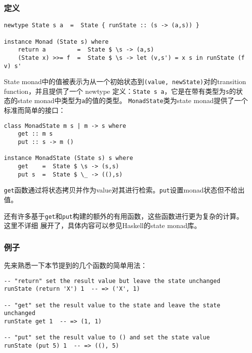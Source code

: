 \subsubsection{定义}
\vspace{-1.5em}
\begin{verbatim}
newtype State s a  =  State { runState :: (s -> (a,s)) }

instance Monad (State s) where
    return a         =  State $ \s -> (a,s)
    (State x) >>= f  =  State $ \s -> let (v,s') = x s in runState (f v) s'
\end{verbatim}
\noindent{}State monad中的值被表示为从一个初始状态到\texttt{(value, newState)}对的transition function，并且提供了一个
newtype 定义：\texttt{State s a}，它是在带有类型为\texttt{s}的状态的state monad中类型为\texttt{a}的值的类型。
\texttt{MonadState}类为state monad提供了一个标准而简单的接口：
\vspace{-0.5em}
\begin{verbatim}
class MonadState m s | m -> s where
    get :: m s
    put :: s -> m ()

instance MonadState (State s) s where
    get    =  State $ \s -> (s,s)
    put s  =  State $ \_ -> ((),s)
\end{verbatim}
\noindent{}\texttt{get}函数通过将状态拷贝并作为value对其进行检索。\texttt{put}设置monad状态但不给出值。

\indent{}还有许多基于\texttt{get}和\texttt{put}构建的额外的有用函数，这些函数进行更为复杂的计算。这里不详细
展开了，具体内容可以参见Haskell的state monad库。

\subsubsection{例子}
\indent{}先来熟悉一下本节提到的几个函数的简单用法：
\begin{verbatim}
-- "return" set the result value but leave the state unchanged
runState (return 'X') 1  -- => ('X', 1)

-- "get" set the result value to the state and leave the state unchanged
runState get 1  -- => (1, 1)

-- "put" set the result value to () and set the state value
runState (put 5) 1  -- => ((), 5)
\end{verbatim}

